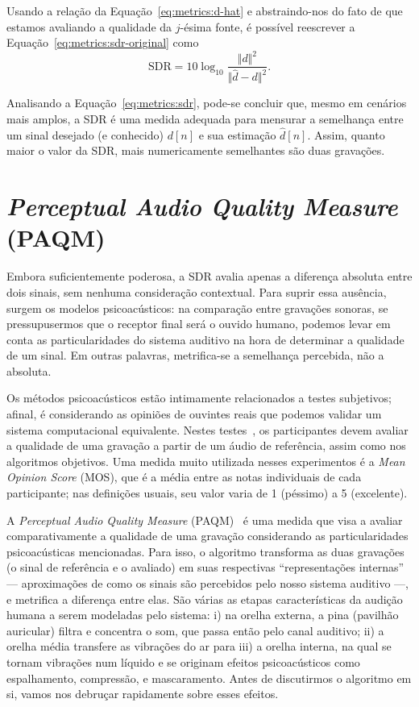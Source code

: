 Usando a relação da Equação~\eqref{eq:metrics:d-hat} e abstraindo-nos do fato de que
estamos avaliando a qualidade da $j$-ésima fonte, é possível reescrever a
Equação~\eqref{eq:metrics:sdr-original} como
\begin{equation}
	\text{SDR} = 10 \log_{10} \frac{\Vert d \Vert^2}{\Vert \hat{d} - d \Vert^2}.
	\label{eq:metrics:sdr}
\end{equation}

Analisando a Equação~\eqref{eq:metrics:sdr}, pode-se concluir que, mesmo em cenários
mais amplos, a SDR é uma medida adequada para mensurar a semelhança entre um sinal
desejado (e conhecido) $d[n]$ e sua estimação $\hat{d}[n]$. Assim, quanto maior o valor
da SDR, mais numericamente semelhantes são duas gravações.

\section{\textit{Perceptual Audio Quality Measure} (PAQM)}
\label{section:metrics:paqm}

Embora suficientemente poderosa, a SDR avalia apenas a diferença absoluta entre dois
sinais, sem nenhuma consideração contextual. Para suprir essa ausência, surgem os
modelos psicoacústicos: na comparação entre gravações sonoras, se pressupusermos que o
receptor final será o ouvido humano, podemos levar em conta as particularidades do
sistema auditivo na hora de determinar a qualidade de um sinal. Em outras palavras,
metrifica-se a semelhança percebida, não a absoluta.

Os métodos psicoacústicos estão intimamente relacionados a testes subjetivos; afinal, é
considerando as opiniões de ouvintes reais que podemos validar um sistema computacional
equivalente. Nestes testes~\cite{bech-2006}, os participantes devem avaliar a qualidade
de uma gravação a partir de um áudio de referência, assim como nos algoritmos
objetivos. Uma medida muito utilizada nesses experimentos é a \textit{Mean Opinion
	Score} (MOS), que é a média entre as notas
individuais de cada participante; nas definições usuais, seu valor varia de 1 (péssimo)
a 5 (excelente).

A \textit{Perceptual Audio Quality Measure} (PAQM)~\cite{beerends-1992} é uma medida
que visa a avaliar comparativamente a qualidade de uma gravação considerando as
particularidades psicoacústicas mencionadas. Para isso, o algoritmo transforma as duas
gravações (o sinal de referência e o avaliado) em suas respectivas ``representações
internas'' --- aproximações de como os sinais são percebidos pelo nosso sistema
auditivo ---, e metrifica a diferença entre elas. São várias as etapas características
da audição humana a serem modeladas pelo sistema: i) na orelha externa, a pina
(pavilhão auricular) filtra e concentra o som, que passa então pelo canal auditivo; ii)
a orelha média transfere as vibrações do ar para iii) a orelha interna, na qual se
tornam vibrações num líquido e se originam efeitos psicoacústicos como espalhamento,
compressão, e mascaramento. Antes de discutirmos o algoritmo em si, vamos nos debruçar
rapidamente sobre esses efeitos.


